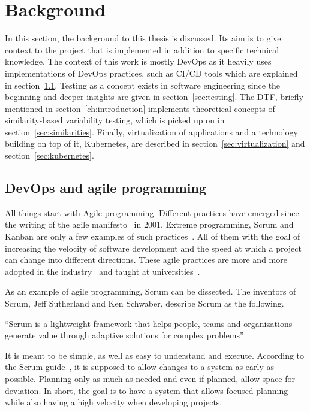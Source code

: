 \chapter{Background}\label{ch:background}

In this section, the background to this thesis is discussed.
Its aim is to give context to the project that is implemented in addition to specific technical knowledge.
The context of this work is mostly DevOps as it heavily uses implementations of DevOps practices, such as CI/CD tools which are explained in section~\ref{sec:devops-and-agile-programming}.
Testing as a concept exists in software engineering since the beginning and deeper insights are given in section~\ref{sec:testing}.
The DTF, briefly mentioned in section~\ref{ch:introduction} implements theoretical concepts of similarity-based variability testing, which is picked up on in section~\ref{sec:similarities}.
Finally, virtualization of applications and a technology building on top of it, Kubernetes, are described in section~\ref{sec:virtualization} and section~\ref{sec:kubernetes}.

\section{DevOps and agile programming}\label{sec:devops-and-agile-programming}

All things start with Agile programming.
Different practices have emerged since the writing of the agile manifesto~\cite{AgileManifesto} in 2001.
Extreme programming, Scrum and Kanban are only a few examples of such practices~\cite{ADecadeOfAgileMethodologies}.
All of them with the goal of increasing the velocity of software development and the speed at which a project can change into different directions.
These agile practices are more and more adopted in the industry~\cite{BecomingAgileTogether} and taught at universities~\cite{StudienhandbuchProjectManagement}.

As an example of agile programming, Scrum can be dissected.
The inventors of Scrum, Jeff Sutherland and Ken Schwaber, describe Scrum as the following.

``Scrum is a lightweight framework that helps people, teams and organizations generate value through
adaptive solutions for complex problems''~\cite{the-scrum-guide}

It is meant to be simple, as well as easy to understand and execute.
According to the Scrum guide~\cite{the-scrum-guide}, it is supposed to allow changes to a system as early as possible.
Planning only as much as needed and even if planned, allow space for deviation.
In short, the goal is to have a system that allows focused planning while also having a high velocity when developing projects.

